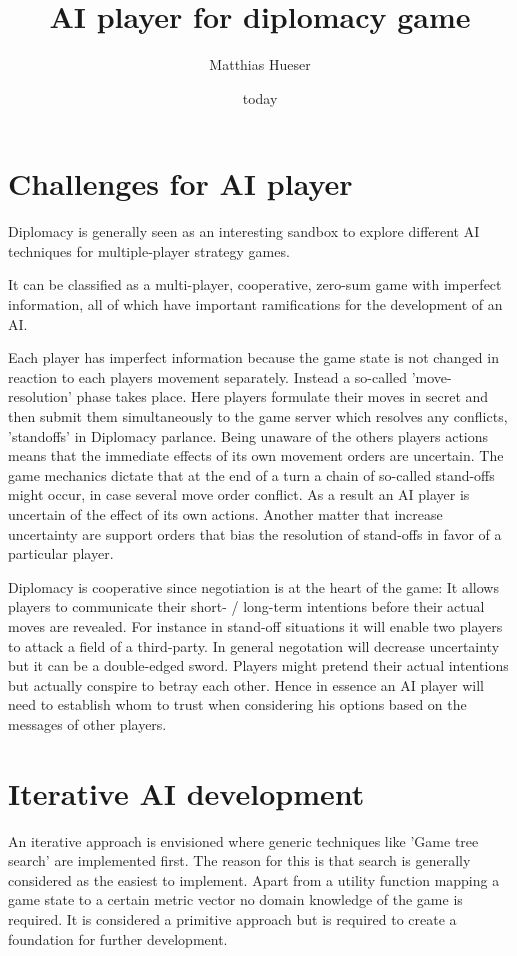 \documentclass[12pt]{article}
\title{AI player for diplomacy game}
\author{Matthias Hueser}
\date{today}
\begin{document}
\maketitle

\section{Challenges for AI player}

Diplomacy is generally seen as an interesting sandbox to explore
different AI techniques for multiple-player strategy games.

It can be classified as a multi-player, cooperative, zero-sum game
with imperfect information, all of which have important ramifications
for the development of an AI.

Each player has imperfect information because the game state is not
changed in reaction to each players movement separately. Instead a 
so-called 'move-resolution' phase takes place. Here players formulate
their moves in secret and then submit them simultaneously to the game
server which resolves any conflicts, 'standoffs'
in Diplomacy parlance. Being unaware of the others players actions means
that the immediate effects of its own movement orders are uncertain. The
game mechanics dictate that at the end of a turn a chain of so-called 
stand-offs might occur, in case several move order conflict. As a result
an AI player is uncertain of the effect of its own actions. Another matter
that increase uncertainty are support orders that bias the resolution of
stand-offs in favor of a particular player. 

Diplomacy is cooperative since negotiation is at the heart of the game:
It allows players to communicate their short- / long-term intentions before
their actual moves are revealed. For instance in stand-off situations it will
enable two players to attack a field of a third-party. In general negotation
will decrease uncertainty but it can be a double-edged sword. Players might
pretend their actual intentions but actually conspire to betray each other. Hence
in essence an AI player will need to establish whom to trust when considering
his options based on the messages of other players.


\section{Iterative AI development}

An iterative approach is envisioned where generic techniques
like 'Game tree search' are implemented first. The reason for this is that 
search is generally considered as the easiest to implement. Apart from
a utility function mapping a game state to a certain metric vector no 
domain knowledge of the game is required. It is considered a primitive
approach but is required to create a foundation for further development.
\end{document}
